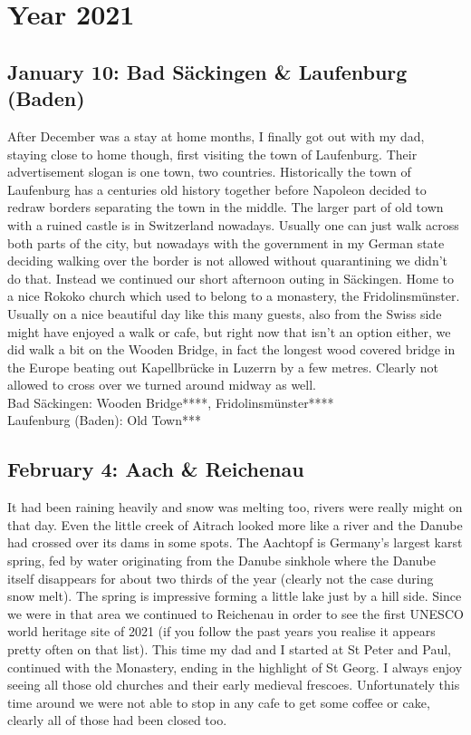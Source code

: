 \chapter{Year 2021}
\label{2021}

\section{January 10: Bad S\"ackingen \& Laufenburg (Baden)}
\label{2021:BadSaeckingen}

After December was a stay at home months, I finally got out with my dad, staying close to home though, first visiting the town of Laufenburg. Their advertisement slogan is one town, two countries. Historically the town of Laufenburg has a centuries old history together before Napoleon decided to redraw borders separating the town in the middle. The larger part of old town with a ruined castle is in Switzerland nowadays. Usually one can just walk across both parts of the city, but nowadays with the government in my German state deciding walking over the border is not allowed without quarantining we didn't do that. Instead we continued our short afternoon outing in S\"ackingen. Home to a nice Rokoko church which used to belong to a monastery, the Fridolinsm\"unster. Usually on a nice beautiful day like this many guests, also from the Swiss side might have enjoyed a walk or cafe, but right now that isn't an option either, we did walk a bit on the Wooden Bridge, in fact the longest wood covered bridge in the Europe beating out Kapellbr\"ucke in Luzerrn by a few metres. Clearly not allowed to cross over we turned around midway as well.\\

Bad S\"ackingen: Wooden Bridge****, Fridolinsm\"unster****\\
Laufenburg (Baden): Old Town***\\

\section{February 4: Aach \& Reichenau}
\label{2021:AachReichenau}

It had been raining heavily and snow was melting too, rivers were really might on that day. Even the little creek of Aitrach looked more like a river and the Danube had crossed over its dams in some spots. The Aachtopf is Germany's largest karst spring, fed by water originating from the Danube sinkhole where the Danube itself disappears for about two thirds of the year (clearly not the case during snow melt). The spring is impressive forming a little lake just by a hill side. Since we were in that area we continued to Reichenau in order to see the first UNESCO world heritage site of 2021 (if you follow the past years you realise it appears pretty often on that list). This time my dad and I started at St Peter and Paul, continued with the Monastery, ending in the highlight of St Georg. I always enjoy seeing all those old churches and their early medieval frescoes. Unfortunately this time around we were not able to stop in any cafe to get some coffee or cake, clearly all of those had been closed too.\\

